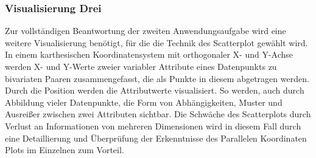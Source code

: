 \documentclass[usegeometry=true]{scrartcl}
\begin{document}




\subsubsection{Visualisierung Drei}
Zur vollständigen Beantwortung der zweiten Anwendungsaufgabe wird eine weitere Visualisierung benötigt, für die die Technik des Scatterplot gewählt wird.
In einem karthesischen Koordinatensystem mit orthogonaler X- und Y-Achse werden X- und Y-Werte zweier variabler Attribute eines Datenpunkts zu bivariaten Paaren zusammengefasst, die als Punkte in diesem abgetragen werden.
Durch die Position werden die Attributwerte visualisiert. %
So werden, auch durch Abbildung vieler Datenpunkte, die Form von Abhängigkeiten, Muster und Ausreißer zwischen zwei Attributen sichtbar.%
Die Schwäche des Scatterplots durch Verlust an Informationen von mehreren Dimensionen wird in diesem Fall durch eine Detaillierung und Überprüfung der Erkenntnisse des Parallelen Koordinaten Plots im Einzelnen zum Vorteil.%
\end{document}

